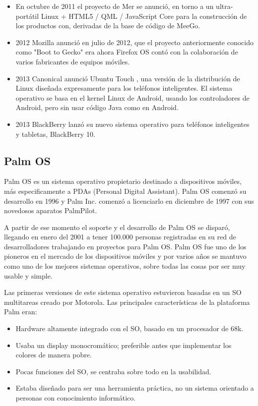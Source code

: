 \begin{itemize}
	\item En octubre de 2011 el proyecto de Mer se anunció, en torno a un ultra-portátil Linux + HTML5 / QML / JavaScript Core para la construcción de los productos con, 	
			derivadas de la base de código de MeeGo. 
	\item 2012 Mozilla anunció en julio de 2012, que el proyecto anteriormente conocido como "Boot to Gecko" era ahora Firefox OS contó con la colaboración de varios 		
			fabricantes de equipos móviles.
	\item 2013 Canonical anunció Ubuntu Touch , una versión de la distribución de Linux diseñada expresamente para los teléfonos inteligentes. El sistema operativo se basa 
			en el kernel Linux de Android, usando los controladores de Android, pero sin usar código Java como en Android.
	\item 2013 BlackBerry lanzó su nuevo sistema operativo para teléfonos inteligentes y tabletas, BlackBerry 10.
\end{itemize}

\subsection*{Palm OS}
Palm OS es un sistema operativo propietario destinado a dispositivos móviles, más especificamente a PDAs (Personal Digital Assistant). Palm OS comenzó su desarrollo en 1996 y Palm Inc. comenzó a licenciarlo en diciembre de 1997 con sus novedosos aparatos PalmPilot.                                               

A partir de ese momento el soporte y el desarrollo de Palm OS se disparó, llegando en enero del 2001 a tener 100.000 personas registradas en su 
red de desarrolladores trabajando en proyectos para Palm OS. Palm OS fue uno de los pioneros en el mercado de los dispositivos móviles y por 
varios años se mantuvo como uno de los mejores sistemas operativos, sobre todas las cosas por ser muy usable y simple.                                                                                                                                                                                    
                                                                                                                                                                              
Las primeras versiones de este sistema operativo estuvieron basadas en un SO multitareas creado por Motorola. Las principales características de la plataforma Palm eran:  
\begin{itemize}
	\item Hardware altamente integrado con el SO, basado en un procesador de 68k.
	\item Usaba un display monocromático; preferible antes que implementar los colores de manera pobre.
	\item Pocas funciones del SO, se centraba sobre todo en la usabilidad.
	\item Estaba diseñado para ser una herramienta práctica, no un sistema orientado a personas con conocimiento informático.	
\end{itemize}                                                                         

